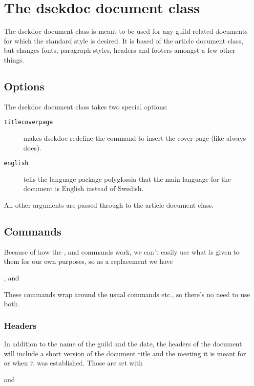 \documentclass[a4paper, oneside]{ltxdoc}
\begin{document}
\section{The \textsf{dsekdoc} document class}
The \textsf{dsekdoc} document class is meant to be used for any guild related
documents for which the standard style is desired.  It is based of the
\textsf{article} document class, but changes fonts, paragraph styles, headers
and footers amongst a few other things.

\subsection{Options}
The \textsf{dsekdoc} document class takes two special options:
\begin{description}
  \item[\texttt{titlecoverpage}] makes \textsf{dsekdoc} redefine the
         command to insert the cover page (like 
        always does).
  \item[\texttt{english}] tells the language package \textsf{polyglossia} that
        the main language for the document is English instead of Swedish.
\end{description}
All other arguments are passed through to the \textsf{article} document class.

\subsection{Commands}
Because of how the ,  and  commands work, we can't
easily use what is given to them for our own purposes, so as a replacement we
have
\begin{center}
  ,  and 
\end{center}

These commands wrap around the usual  commands etc., so there's no
need to use both.

\subsubsection{Headers}
In addition to the name of the guild and the date, the headers of the document
will include a short version of the document title and the meeting it is meant
for or when it was established.  Those are set with

\begin{center}
   and 
\end{center}
\end{document}
